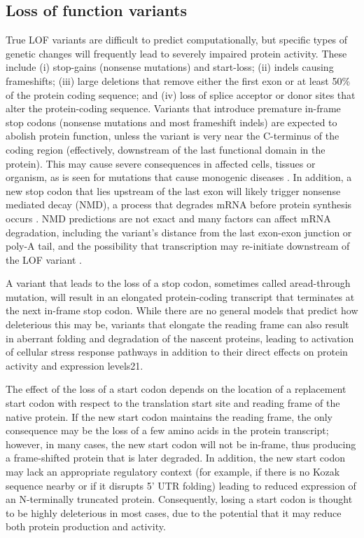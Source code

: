 \subsection{Loss of function variants}

True LOF variants are difficult to predict computationally, but specific types of genetic changes will frequently lead to severely impaired protein activity. These include (i) stop-gains (nonsense mutations) and start-loss; (ii) indels causing frameshifts; (iii) large deletions that remove either the first exon or at least 50\% of the protein coding sequence; and (iv) loss of splice acceptor or donor sites that alter the protein-coding sequence. Variants that introduce premature in-frame stop codons (nonsense mutations and most frameshift indels) are expected to abolish protein function, unless the variant is very near the C-terminus of the coding region \cite{yamaguchi2008distribution} (effectively, downstream of the last functional domain in the protein). This may cause severe consequences in affected cells, tissues or organism, as is seen for mutations that cause monogenic diseases \cite{scheper2007translation}. In addition, a new stop codon that lies upstream of the last exon will likely trigger nonsense mediated decay (NMD), a process that degrades mRNA before protein synthesis occurs \cite{nagy1998rule}. NMD predictions are not exact and many factors can affect mRNA degradation, including the variant’s distance from the last exon-exon junction or poly-A tail, and the possibility that transcription may re-initiate downstream of the LOF variant \cite{brogna2009nonsense}.

A variant that leads to the loss of a stop codon, sometimes called aread-through mutation, will result in an elongated protein-coding transcript that terminates at the next in-frame stop codon. While there are no general models that predict how deleterious this may be, variants that elongate the reading frame can also result in aberrant folding and degradation of the nascent proteins, leading to activation of cellular stress response pathways in addition to their direct effects on protein activity and expression levels21.

The effect of the loss of a start codon depends on the location of a replacement start codon with respect to the translation start site and reading frame of the native protein. If the new start codon maintains the reading frame, the only consequence may be the loss of a few amino acids in the protein transcript; however, in many cases, the new start codon will not be in-frame, thus producing a frame-shifted protein that is later degraded. In addition, the new start codon may lack an appropriate regulatory context (for example, if there is no Kozak sequence nearby or if it disrupts 5’ UTR folding) leading to reduced expression of an N-terminally truncated protein. Consequently, losing a start codon is thought to be highly deleterious in most cases, due to the potential that it may reduce both protein production and activity.

